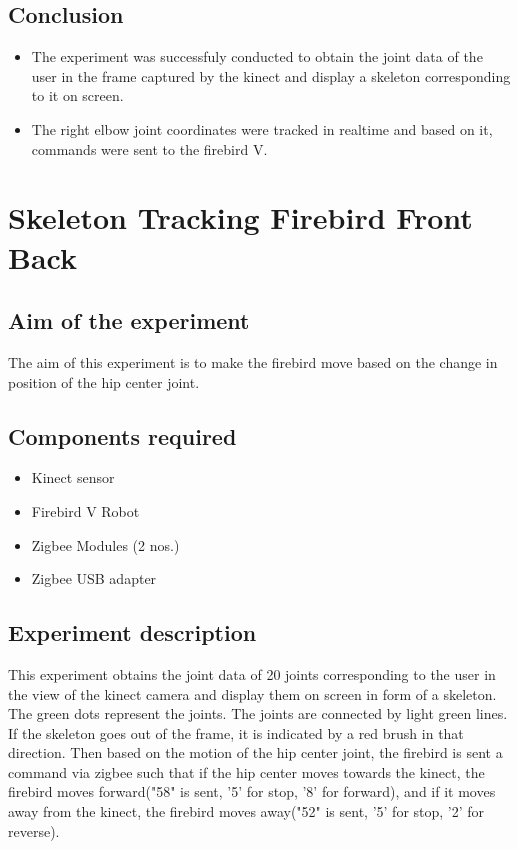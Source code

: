 \begin{flushleft}
\subsection{\textbf{ Conclusion}}
\begin{itemize}
\item The experiment was successfuly conducted to obtain the joint data of the user in the frame captured by the kinect and display a skeleton corresponding to it on screen.
\item The right elbow joint coordinates were tracked in realtime and based on it, commands were sent to the firebird V.
\end{itemize}

\medskip
\newpage

\section{\textbf{ Skeleton Tracking Firebird Front Back}}
\label{4.6}

\medskip
\subsection{\textbf{ Aim of the experiment}}
The aim of this experiment is to make the firebird move based on the change in position of the hip center joint.
\medskip

\subsection{\textbf{ Components required}}
\begin{itemize}
\item Kinect sensor
\item Firebird V Robot
\item Zigbee Modules (2 nos.)
\item Zigbee USB adapter
\end{itemize}
\medskip

\subsection{\textbf{ Experiment description}}
This experiment obtains the joint data of 20 joints corresponding to the user in the view of the kinect camera and display them on screen in form of a skeleton. The green dots represent the joints. The joints are connected by light green lines. If the skeleton goes out of the frame, it is indicated by a red brush in that direction. Then based on the motion of the hip center joint, the firebird is sent a command via zigbee such that if the hip center moves towards the kinect, the firebird moves forward("58" is sent, '5' for stop, '8' for forward), and if it moves away from the kinect, the firebird moves away("52" is sent, '5' for stop, '2' for reverse).


\end{flushleft}
